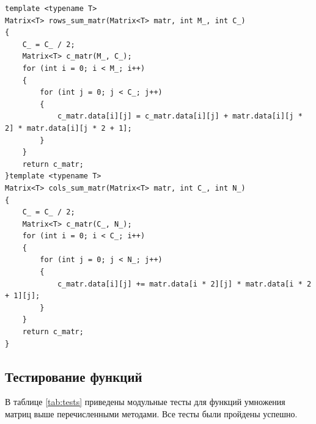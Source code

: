 \begin{lstlisting}[caption=Вспомогательные процедуры для оптимизированного  алгоритма умножения матриц Винограда, label=list:vinograd, language={}]
template <typename T>
Matrix<T> rows_sum_matr(Matrix<T> matr, int M_, int C_)
{
	C_ = C_ / 2;
	Matrix<T> c_matr(M_, C_);
	for (int i = 0; i < M_; i++)
	{
		for (int j = 0; j < C_; j++)
		{
			c_matr.data[i][j] = c_matr.data[i][j] + matr.data[i][j * 2] * matr.data[i][j * 2 + 1];
		}
	}
	return c_matr;
}template <typename T>
Matrix<T> cols_sum_matr(Matrix<T> matr, int C_, int N_)
{
	C_ = C_ / 2;
	Matrix<T> c_matr(C_, N_);
	for (int i = 0; i < C_; i++)
	{
		for (int j = 0; j < N_; j++)
		{
			c_matr.data[i][j] += matr.data[i * 2][j] * matr.data[i * 2 + 1][j];
		}
	}
	return c_matr;
}
\end{lstlisting}
\subsection{Тестирование функций}

В таблице \ref{tab:tests} приведены модульные тесты для функций умножения матриц выше перечисленными методами. Все тесты были пройдены успешно. \\

